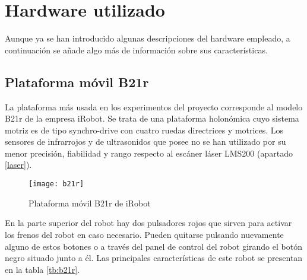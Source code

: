 
\chapter{Hardware utilizado}\label{ap:hardware}
Aunque ya se han introducido algunas descripciones del hardware empleado, a continuación se añade algo más de información sobre sus características.

\section{Plataforma móvil B21r}
La plataforma más usada en los experimentos del proyecto corresponde al modelo B21r de la empresa iRobot. Se trata de una plataforma holonómica cuyo sistema motriz es de tipo synchro-drive con cuatro ruedas directrices y motrices. Los sensores de infrarrojos y de ultrasonidos que posee no se han utilizado por su menor precisión, fiabilidad y rango respecto al escáner láser LMS200 (apartado \ref{laser}).

\begin{figure}[h]
  \centering\texttt{[image: b21r]}\\
  \caption{Plataforma móvil B21r de iRobot}\label{fg:b21r}
\end{figure}

En la parte superior del robot hay dos pulsadores rojos que sirven para activar los frenos del robot en caso necesario. Pueden quitarse pulsando nuevamente alguno de estos botones o a través del panel de control del robot girando el botón negro situado junto a él.
Las principales características de este robot se presentan en la tabla \ref{tb:b21r}.


